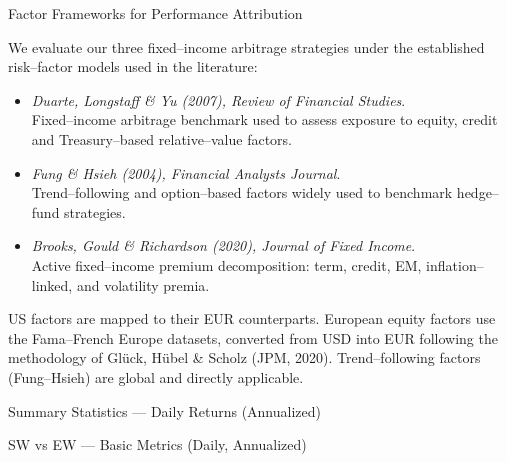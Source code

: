 \documentclass[aspectratio=169,11pt]{beamer}
\begin{document}
\begin{frame}[t]{Factor Frameworks for Performance Attribution}
\small

We evaluate our three fixed–income arbitrage strategies under the 
established risk–factor models used in the literature:

\begin{itemize}
    \item \textit{Duarte, Longstaff \& Yu (2007), Review of Financial Studies}.\\
    Fixed–income arbitrage benchmark used to assess exposure to equity, 
    credit and Treasury–based relative–value factors.

    \item \textit{Fung \& Hsieh (2004), Financial Analysts Journal}.\\
    Trend–following and option–based factors widely used to benchmark 
    hedge–fund strategies.

    \item \textit{Brooks, Gould \& Richardson (2020), Journal of Fixed Income}.\\
    Active fixed–income premium decomposition: term, credit, EM, inflation–linked, 
    and volatility premia.
\end{itemize}

\vspace{0.3cm}

\scriptsize
US factors are mapped to their EUR counterparts. 
European equity factors use the Fama–French Europe datasets, converted from USD 
into EUR following the methodology of Glück, Hübel \& Scholz (JPM, 2020). 
Trend–following factors (Fung–Hsieh) are global and directly applicable.

\end{frame}

\begin{frame}{Summary Statistics — Daily Returns (Annualized)}
\centering
\vfill

\scriptsize
\setlength{\tabcolsep}{3pt}



\vfill
\end{frame}



\begin{frame}[t,shrink=18]{SW vs EW — Basic Metrics (Daily, Annualized)}
\centering
\scriptsize
\setlength{\tabcolsep}{2pt} 
\renewcommand{\arraystretch}{0.95}



\end{frame}
\end{document}

